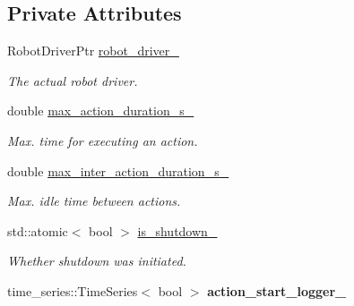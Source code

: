 \subsection*{Private Attributes}
\begin{DoxyCompactItemize}
\item 
Robot\+Driver\+Ptr \hyperlink{classrobot__interfaces_1_1MonitoredRobotDriver_ae43540d38c9414d8ad734a9c88155a6e}{robot\+\_\+driver\+\_\+}\hypertarget{classrobot__interfaces_1_1MonitoredRobotDriver_ae43540d38c9414d8ad734a9c88155a6e}{}\label{classrobot__interfaces_1_1MonitoredRobotDriver_ae43540d38c9414d8ad734a9c88155a6e}

\begin{DoxyCompactList}\small\item\em The actual robot driver. \end{DoxyCompactList}\item 
double \hyperlink{classrobot__interfaces_1_1MonitoredRobotDriver_a860e5a4835a916faf08e1ab932b34bb1}{max\+\_\+action\+\_\+duration\+\_\+s\+\_\+}\hypertarget{classrobot__interfaces_1_1MonitoredRobotDriver_a860e5a4835a916faf08e1ab932b34bb1}{}\label{classrobot__interfaces_1_1MonitoredRobotDriver_a860e5a4835a916faf08e1ab932b34bb1}

\begin{DoxyCompactList}\small\item\em Max. time for executing an action. \end{DoxyCompactList}\item 
double \hyperlink{classrobot__interfaces_1_1MonitoredRobotDriver_acef35c51b51f1d05453b5b672f43a516}{max\+\_\+inter\+\_\+action\+\_\+duration\+\_\+s\+\_\+}\hypertarget{classrobot__interfaces_1_1MonitoredRobotDriver_acef35c51b51f1d05453b5b672f43a516}{}\label{classrobot__interfaces_1_1MonitoredRobotDriver_acef35c51b51f1d05453b5b672f43a516}

\begin{DoxyCompactList}\small\item\em Max. idle time between actions. \end{DoxyCompactList}\item 
std\+::atomic$<$ bool $>$ \hyperlink{classrobot__interfaces_1_1MonitoredRobotDriver_a8200e14e4d9e4d1d8c2fc4e0134cf7cd}{is\+\_\+shutdown\+\_\+}\hypertarget{classrobot__interfaces_1_1MonitoredRobotDriver_a8200e14e4d9e4d1d8c2fc4e0134cf7cd}{}\label{classrobot__interfaces_1_1MonitoredRobotDriver_a8200e14e4d9e4d1d8c2fc4e0134cf7cd}

\begin{DoxyCompactList}\small\item\em Whether shutdown was initiated. \end{DoxyCompactList}\item 
time\+\_\+series\+::\+Time\+Series$<$ bool $>$ {\bfseries action\+\_\+start\+\_\+logger\+\_\+}\hypertarget{classrobot__interfaces_1_1MonitoredRobotDriver_a5c02465be067a76143495c47469d0ae3}{}\label{classrobot__interfaces_1_1MonitoredRobotDriver_a5c02465be067a76143495c47469d0ae3}


\end{DoxyCompactItemize}
